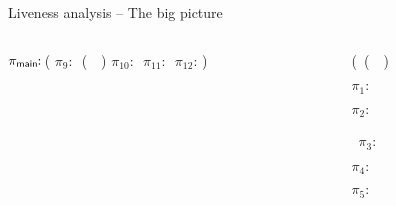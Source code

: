 \documentclass[xcolor=x11names,compress,mathserif]{beamer}
\renewcommand{\(}{\begin{columns}}
\renewcommand{\)}{\end{columns}}
\newcommand{\<}[1]{\begin{column}{#1}}
\renewcommand{\>}{\end{column}}
\begin{document}
\begin{frame}[t]{Liveness analysis -- The big picture}

\small
\begin{columns}[c]
 \begin{column}[T]{0.5\textwidth}
\hspace*{-.3cm}\renewcommand{\arraystretch}{1}{
	  \begin{uprogram}
	  \hspace*{-.2cm} $\pi_{\sf main}\!\!:\, $(\onslide<0>{\LET\  \pz\  $\leftarrow$ \ldots  \IN
	  \UNL{2}   \hspace*{.3cm}              (\LET\ \py\  $\leftarrow$  \ldots \IN}
             \hspace*{-.5cm}    $\pi_9\!\!:\, $  (\append\ \py\ \pz) 
             \hspace*{-.8cm}  $\pi_{10}\!\!:\, $
	     \hspace*{-1.1cm}  $\pi_{11}\!\!:\, $\onslide<0>{(\LET\ \pb\  $\leftarrow$ (\CAR\  \pa) \IN}
             \hspace*{-1.4cm} $\pi_{12}\!\!:\,$)
\end{uprogram}}
 \end{column}
 \begin{column}[T]{0.6\textwidth}
\hspace*{.4cm}  \renewcommand{\arraystretch}{1}{
  \begin{uprogram}
    \hspace*{-.7cm} (\DEFINE\ (\append~\lista~\listb)

    \hspace*{-1cm}  $\pi_1\!\!:\, $


     \hspace*{-1.4cm}     $\pi_2\!\!:\, $

~$\pi_3\!\!:$ 
 
          \hspace*{-1.8cm} \hspace*{.05cm}    
 $\pi_4\!\!:\, $

	  \hspace*{-2.1cm}  \hspace*{.05cm}    $\pi_5\!\!:\,$\onslide<0>{  \IN}



\end{uprogram}}
\end{column}
\end{columns}
\end{frame}
\end{document}

